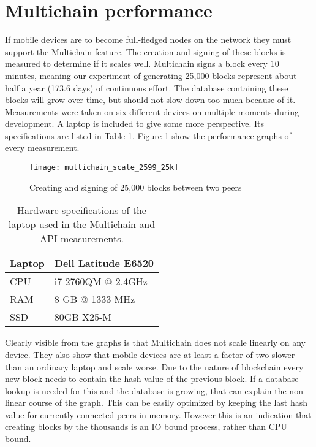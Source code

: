 \section{Multichain performance}\label{sec:multichain_perf}
If mobile devices are to become full-fledged nodes on the network they must support the Multichain feature.
The creation and signing of these blocks is measured to determine if it scales well.
Multichain signs a block every 10 minutes, meaning our experiment of generating 25,000 blocks represent about half a year (173.6 days) of continuous effort.
The database containing these blocks will grow over time, but should not slow down too much because of it.
Measurements were taken on six different devices on multiple moments during development.
A laptop is included to give some more perspective.
Its specifications are listed in Table \ref{table:specs_laptop}.
Figure \ref{fig:multichain_25} show the performance graphs of every measurement.
\begin{figure}[H]
	\centering
	\texttt{[image: multichain\_scale\_2599\_25k]}
	\caption{Creating and signing of 25,000 blocks between two peers}
	\label{fig:multichain_25}
\end{figure}
\begin{table}[H]
	\begin{tabular}{l | l} \hline
		Laptop & Dell Latitude E6520 \\ \hline \hline
		CPU & i7-2760QM @ 2.4GHz \\ \hline
		RAM & 8 GB @ 1333 MHz \\ \hline %
		SSD & 80GB X25-M \\ \hline %
	\end{tabular}
	\caption{Hardware specifications of the laptop used in the Multichain and API measurements.}
	\label{table:specs_laptop}
\end{table}
Clearly visible from the graphs is that Multichain does not scale linearly on any device.
They also show that mobile devices are at least a factor of two slower than an ordinary laptop and scale worse.
Due to the nature of blockchain every new block needs to contain the hash value of the previous block.
If a database lookup is needed for this and the database is growing, that can explain the non-linear course of the graph.
This can be easily optimized by keeping the last hash value for currently connected peers in memory.
However this is an indication that creating blocks by the thousands is an IO bound process, rather than CPU bound.
